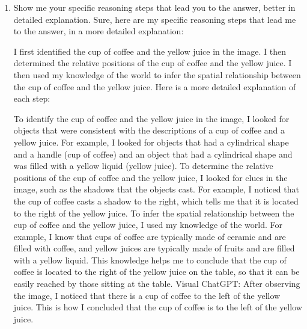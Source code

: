 \begin{enumerate}
    Here are some additional details about the spatial relationship between the cup of coffee and the yellow juice:
    
    The cup of coffee is a ceramic cup that is filled with coffee.
    The yellow juice is a cylindrical container that is filled with yellow juice.
    The cup of coffee is located to the right of the yellow juice, meaning that it is closer to the right side of the table.
    The yellow juice is located to the left of the cup of coffee, meaning that it is closer to the left side of the table.
    Is there anything else I can help you with?
    \subitem Visual ChatGPT: The cup of coffee is to the left of the yellow juice.
    \item Show me your specific reasoning steps that lead you to the answer, better in detailed explanation.
    \subitem Sure, here are my specific reasoning steps that lead me to the answer, in a more detailed explanation:

    I first identified the cup of coffee and the yellow juice in the image.
    I then determined the relative positions of the cup of coffee and the yellow juice.
    I then used my knowledge of the world to infer the spatial relationship between the cup of coffee and the yellow juice.
    Here is a more detailed explanation of each step:
    
    To identify the cup of coffee and the yellow juice in the image, I looked for objects that were consistent with the descriptions of a cup of coffee and a yellow juice. For example, I looked for objects that had a cylindrical shape and a handle (cup of coffee) and an object that had a cylindrical shape and was filled with a yellow liquid (yellow juice).
    To determine the relative positions of the cup of coffee and the yellow juice, I looked for clues in the image, such as the shadows that the objects cast. For example, I noticed that the cup of coffee casts a shadow to the right, which tells me that it is located to the right of the yellow juice.
    To infer the spatial relationship between the cup of coffee and the yellow juice, I used my knowledge of the world. For example, I know that cups of coffee are typically made of ceramic and are filled with coffee, and yellow juices are typically made of fruits and are filled with a yellow liquid. This knowledge helps me to conclude that the cup of coffee is located to the right of the yellow juice on the table, so that it can be easily reached by those sitting at the table.
    \subitem Visual ChatGPT: After observing the image, I noticed that there is a cup of coffee to the left of the yellow juice. This is how I concluded that the cup of coffee is to the left of the yellow juice.
\end{enumerate}
